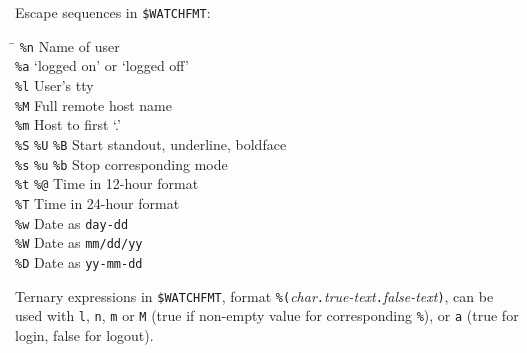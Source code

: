 \documentclass{article}
\newcommand\I[1]{\textsl{#1}}
\newcommand\T[1]{\texttt{#1}}
\begin{document}
\begin{multicols}{3}
Escape sequences in \verb!$WATCHFMT!:
\begin{tabbing}
\hskip 50pt \= \kill
\verb!%n!          \> Name of user \\
\verb!%a!          \> `logged on' or `logged off' \\
\verb!%l!          \> User's tty \\
\verb!%M!          \> Full remote host name \\
\verb!%m!          \> Host to first `.' \\
\verb!%S! \verb!%U! \verb!%B!
                   \> Start standout, underline, boldface \\
\verb!%s! \verb!%u! \verb!%b!
                   \> Stop corresponding mode \\
\verb!%t! \verb!%@!
                   \> Time in 12-hour format \\
\verb!%T!          \> Time in 24-hour format \\
\verb!%w!          \> Date as \verb!day-dd! \\
\verb!%W!          \> Date as \verb!mm/dd/yy! \\
\verb!%D!          \> Date as \verb!yy-mm-dd! \\
\end{tabbing}

\end{multicols}

Ternary expressions in \verb!$WATCHFMT!, format
\verb!%(!\I{char}\verb!.!\I{true-text}\verb!.!\I{false-text}\verb!)!,
can be used with \T{l}, \T{n}, \T{m} or \T{M} (true if non-empty value
for corresponding \verb!%!), or \T{a} (true for login, false for
logout).
\end{document}
